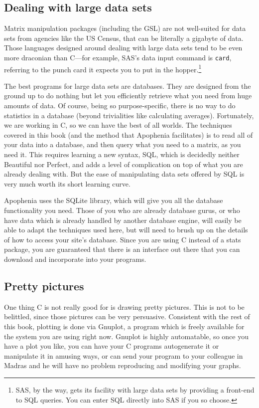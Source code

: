 \documentclass[12pt,notitlepage, openany]{book}
\def\ind#1{\index{#1}#1}
\begin{document}
\begin{multicols}{2}
\subsection{Dealing with large data sets} Matrix manipulation packages
(including the GSL) are not well-suited for data sets from agencies like
the US Census, that can be literally a gigabyte of data.
Those languages designed around dealing with large data sets tend
to be even more draconian than C---for example, SAS's data input command
is {\tt card}, referring to the punch card it expects you to put in the
hopper.\footnote{SAS, by the way, gets its facility with large data sets
by providing a front-end to SQL queries. You can enter SQL directly into
SAS if you so choose.}

The best programs for large data sets are \ind{databases}. They are
designed from the ground up to do nothing but let you efficiently
retrieve what you need from huge amounts of data.  Of course, being so
purpose-specific, there is no way to do statistics in a database (beyond
trivialities like calculating averages). Fortunately, we are working in
C, so we can have the best of all worlds. The techniques covered in this
book (and the method that Apophenia facilitates) is to read all of your
data into a database, and then query what you need to a matrix, as you
need it. This requires learning a new syntax, \ind{SQL}, which is decidedly
neither Beautiful nor Perfect, and adds a level of complication on top
of what you are already dealing with. But the ease of manipulating data
sets offered by SQL is very much worth its short learning curve.

Apophenia uses the \ind{SQLite} library, which will
give you all the database functionality you need. Those of you who are
already database gurus, or who have data which is already handled
by another database engine, will easily be able to adapt the techniques
used here, but will need to brush up on the details of how to access
your site's database. Since you are using C instead of a stats package,
you are guaranteed that there is an interface out there that you can
download and incorporate into your programs.

\subsection{Pretty pictures} One thing C is not really good for is drawing
pretty pictures. This is not to be belittled, since those pictures
can be very persuasive. Consistent with the rest of this book, plotting
is done via \ind{Gnuplot}, a program which is freely available for
the system you are using right now. Gnuplot is highly automatable, so once
you have a plot you like, you can have your C programs autogenerate
it or manipulate it in amusing ways, or can send your program to your
colleague in Madras and he will have no problem reproducing and modifying
your graphs.


\end{multicols}
\end{document}
